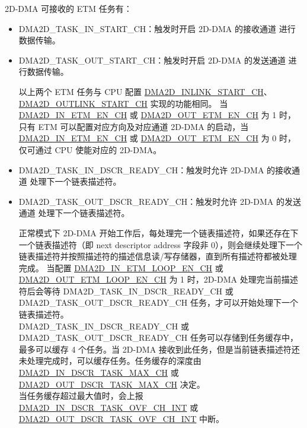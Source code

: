 \documentclass[main\_\_CN.tex]{subfiles}
\begin{document}
2D-DMA 可接收的 ETM 任务有：

\begin{itemize}
\item DMA2D\_TASK\_IN\_START\_CH：触发时开启 2D-DMA 的接收通道  进行数据传输。
\item DMA2D\_TASK\_OUT\_START\_CH：触发时开启 2D-DMA 的发送通道  进行数据传输。
    \begin{tiplisting}
    以上两个 ETM 任务与 CPU 配置 \hyperref[fielddesc:DMA2DINLINKSTARTCHN]{DMA2D\_INLINK\_START\_CH}、\hyperref[fielddesc:DMA2DOUTLINKSTARTCHN]{DMA2D\_OUTLINK\_START\_CH} 实现的功能相同。 当 \hyperref[fielddesc:DMA2DINETMENCHN]{DMA2D\_IN\_ETM\_EN\_CH} 或 \hyperref[fielddesc:DMA2DOUTETMENCHN]{DMA2D\_OUT\_ETM\_EN\_CH} 为 1 时，只有 ETM 可以配置对应方向及对应通道 2D-DMA 的启动，当 \hyperref[fielddesc:DMA2DINETMENCHN]{DMA2D\_IN\_ETM\_EN\_CH} 或 \hyperref[fielddesc:DMA2DOUTETMENCHN]{DMA2D\_OUT\_ETM\_EN\_CH} 为 0 时，仅可通过 CPU 使能对应的 2D-DMA。
    \end{tiplisting}
\item DMA2D\_TASK\_IN\_DSCR\_READY\_CH：触发时允许 2D-DMA 的接收通道  处理下一个链表描述符。
\item DMA2D\_TASK\_OUT\_DSCR\_READY\_CH：触发时允许 2D-DMA 的发送通道  处理下一个链表描述符。
    \begin{tiplisting}
    正常模式下 2D-DMA 开始工作后，每处理完一个链表描述符，如果还存在下一个链表描述符（即 next descriptor address 字段非 0），则会继续处理下一个链表描述符并按照描述符的描述信息读/写存储器，直到所有描述符都被处理完成。 当配置 \hyperref[fielddesc:DMA2DINETMLOOPENCHN]{DMA2D\_IN\_ETM\_LOOP\_EN\_CH} 或 \hyperref[fielddesc:DMA2DOUTETMLOOPENCHN]{DMA2D\_OUT\_ETM\_LOOP\_EN\_CH} 为 1 时，2D-DMA 处理完当前描述符后会等待 DMA2D\_TASK\_IN\_DSCR\_READY\_CH 或 DMA2D\_TASK\_OUT\_DSCR\_READY\_CH 任务，才可以开始处理下一个链表描述符。\\
    DMA2D\_TASK\_IN\_DSCR\_READY\_CH 或 DMA2D\_TASK\_OUT\_DSCR\_READY\_CH 任务可以存储到任务缓存中，最多可以缓存 4 个任务。当 2D-DMA 接收到此任务，但是当前链表描述符还未处理完成时，可以缓存任务。任务缓存的深度由 \hyperref[fielddesc:DMA2DINDSCRTASKMAKCHN]{DMA2D\_IN\_DSCR\_TASK\_MAX\_CH} 或 \hyperref[fielddesc:DMA2DOUTDSCRTASKMAKCHN]{DMA2D\_OUT\_DSCR\_TASK\_MAX\_CH} 决定。\\
    当任务缓存超过最大值时，会上报 \hyperref[int:DMA2DINDSCRTASKOVFINT] {DMA2D\_IN\_DSCR\_TASK\_OVF\_CH\_INT} 或 \\\hyperref[int:DMA2DOUTDSCRTASKOVFINT] {DMA2D\_OUT\_DSCR\_TASK\_OVF\_CH\_INT} 中断。
    \end{tiplisting}
\end{itemize}
\end{document}

